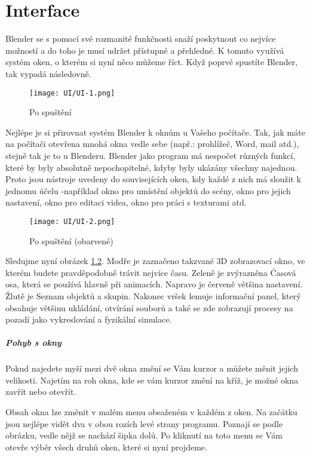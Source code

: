 \documentclass[12pt,a4paper]{report}
\begin{document}
	\chapter{Interface}
	Blender se s pomocí své rozmanité funkčnosti snaží poskytnout co nejvíce
	možností a do toho je musí udržet přístupné a přehledné. K tomuto
	využívá systém oken, o kterém si nyní něco můžeme říct.
	Když poprvé spustíte Blender, tak vypadá následovně.
	
	\begin{figure}[h]
		\centering
		\texttt{[image: UI/UI-1.png]}
		\caption{Po spuštění}
		\label{pic:startup-1}
	\end{figure}

	Nejlépe je si přirovnat systém Blender k oknům u Vašeho počítače. Tak,
	jak máte na počítači otevřena mnohá okna vedle sebe (např.: prohlížeč,
	Word, mail atd.), stejně tak je to u Blenderu. Blender jako program má
	nespočet různých funkcí, které by byly absolutně nepochopitelné, kdyby
	byly ukázány všechny najednou. Proto jsou nástroje uvedeny do
	souvisejících oken, kdy každé z nich má sloužit k jednomu účelu -například okno pro umístění objektů do scény, okno pro jejich nastavení,
	okno pro editaci videa, okno pro práci s texturami atd.
	
	\begin{figure}[h]
		\centering
		\texttt{[image: UI/UI-2.png]}
		\caption{Po spuštění (obarvené)}
		\label{pic:startup-2}
	\end{figure}

	Sledujme nyní obrázek \ref{pic:startup-2}. Modře je zaznačeno takzvané 3D zobrazovací
	okno, ve kterém budete pravděpodobně trávit nejvíce času. Zeleně je
	zvýrazněna Ćasová osa, která se používá hlavně při animacích. Napravo
	je červeně většina nastavení. Žlutě je Seznam objektů a skupin. Nakonec
	vršek lemuje informační panel, který obsahuje většinu ukládání, otvírání
	souborů a také se zde zobrazují procesy na pozadí jako vykreslování
	a fyzikální simulace.
	
	\paragraph{Pohyb s okny} Pokud najedete myší mezi dvě okna změní se Vám
	kurzor a můžete měnit jejich velikosti. Najetím na roh okna, kde se vám
	kurzor změní na kříž, je možné okna zavřít nebo otevřít.
	
	Obsah okna lze změnit v malém menu obsaženém v každém z oken. Na
	začátku jsou nejlépe vidět dva v obou rozích levé strany programu.
	Poznají se podle obrázku, vedle nějž se nachází šipka dolů. Po kliknutí na
	toto menu se Vám otevře výběr všech druhů oken, které si nyní
	projdeme.
	
\end{document}
